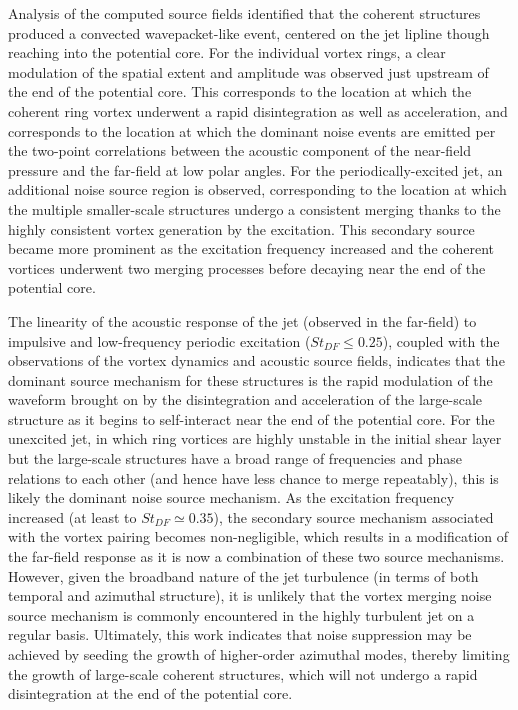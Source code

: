 Analysis of the computed source fields identified that the coherent structures produced a convected wavepacket-like event, centered on the jet lipline though reaching into the potential core.
For the individual vortex rings, a clear modulation of the spatial extent and amplitude was observed just upstream of the end of the potential core.
This corresponds to the location at which the coherent ring vortex underwent a rapid disintegration as well as acceleration, and corresponds to the location at which the dominant noise events are emitted per the two-point correlations between the acoustic component of the near-field pressure and the far-field at low polar angles.
For the periodically-excited jet, an additional noise source region is observed, corresponding to the location at which the multiple smaller-scale structures undergo a consistent merging thanks to the highly consistent vortex generation by the excitation.
This secondary source became more prominent as the excitation frequency increased and the coherent vortices underwent two merging processes before decaying near the end of the potential core.

The linearity of the acoustic response of the jet (observed in the far-field) to impulsive and low-frequency periodic excitation ($St_{DF} \leq 0.25$), coupled with the observations of the vortex dynamics and acoustic source fields, indicates that the dominant source mechanism for these structures is the rapid modulation of the waveform brought on by the disintegration and acceleration of the large-scale structure as it begins to self-interact near the end of the potential core.
For the unexcited jet, in which ring vortices are highly unstable in the initial shear layer but the large-scale structures have a broad range of frequencies and phase relations to each other (and hence have less chance to merge repeatably), this is likely the dominant noise source mechanism. 
As the excitation frequency increased (at least to $St_{DF} \simeq 0.35$), the secondary source mechanism associated with the vortex pairing becomes non-negligible, which results in a modification of the far-field response as it is now a combination of these two source mechanisms.
However, given the broadband nature of the jet turbulence (in terms of both temporal and azimuthal structure), it is unlikely that the vortex merging noise source mechanism is commonly encountered in the highly turbulent jet on a regular basis.
Ultimately, this work indicates that noise suppression may be achieved by seeding the growth of higher-order azimuthal modes, thereby limiting the growth of large-scale coherent structures, which will not undergo a rapid disintegration at the end of the potential core.  